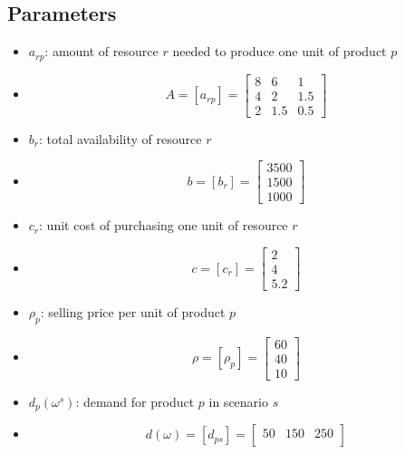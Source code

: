 \documentclass[8pt]{article}
\begin{document}
\subsection*{Parameters}
\begin{itemize}
    \item $a_{rp}$: amount of resource $r$ needed to produce one unit of product $p$
    \item[]
          \[
              A = [a_{rp}] =
              \begin{bmatrix}
                  8 & 6   & 1   \\
                  4 & 2   & 1.5 \\
                  2 & 1.5 & 0.5
              \end{bmatrix}
          \]
    \item $b_r$: total availability of resource $r$
    \item[]
          \[
              b = [b_{r}] =
              \begin{bmatrix}
                  3500 \\
                  1500 \\
                  1000
              \end{bmatrix}
          \]
    \item $c_r$: unit cost of purchasing one unit of resource $r$
    \item[]
          \[
              c = [c_{r}] =
              \begin{bmatrix}
                  2 \\
                  4 \\
                  5.2
              \end{bmatrix}
          \]
    \item $\rho_p$: selling price per unit of product $p$
    \item[]
          \[
              \rho = [\rho_{p}] =
              \begin{bmatrix}
                  60 \\
                  40 \\
                  10
              \end{bmatrix}
          \]
    \item $d_{p}(\omega^s)$: demand for product $p$ in scenario $s$
    \item[]
          \[
              d(\omega) = [d_{ps}] =
              \begin{bmatrix}
                  50  & 150 & 250 \\

\end{bmatrix}\]
\end{itemize}
\end{document}
